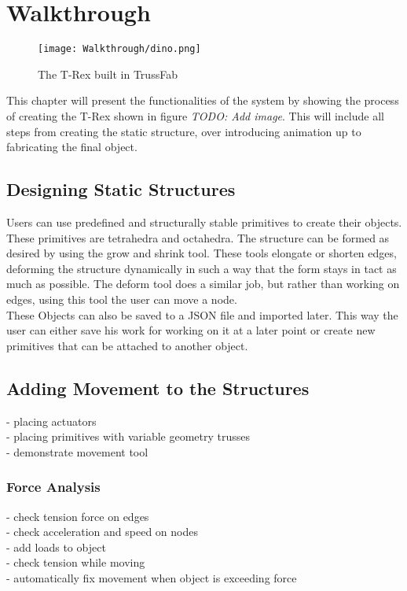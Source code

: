 \chapter{Walkthrough}\label{ch:walkthrough}
\begin{figure}[h!]
    \texttt{[image: Walkthrough/dino.png]}
    \centering
    \caption{The T-Rex built in TrussFab}
    \label{fig:sketchup_objects}
\end{figure}
This chapter will present the functionalities of the system by showing the process of creating the T-Rex shown in figure \textit{TODO: Add image}. This will include all steps from creating the static structure, over introducing animation up to fabricating the final object.
\section{Designing Static Structures}
Users can use predefined and structurally stable primitives to create their objects. These primitives are tetrahedra and octahedra. The structure can be formed as desired by using the grow and shrink tool. These tools elongate or shorten edges, deforming the structure dynamically in such a way that the form stays in tact as much as possible. The deform tool does a similar job, but rather than working on edges, using this tool the user can move a node.\\
These Objects can also be saved to a JSON file and imported later. This way the user can either save his work for working on it at a later point or create new primitives that can be attached to another object.
\section{Adding Movement to the Structures}
- placing actuators\\
- placing primitives with variable geometry trusses\\
- demonstrate movement tool\\
\subsection{Force Analysis}
- check tension force on edges\\
- check acceleration and speed on nodes\\
- add loads to object\\
- check tension while moving\\
- automatically fix movement when object is exceeding force\\
